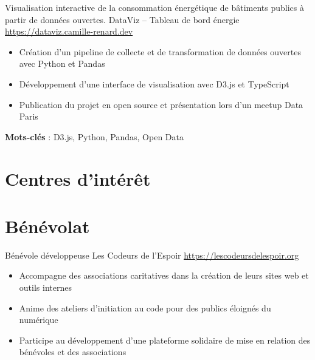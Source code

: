 \documentclass[a4paper, serif, 10pt]{moderncv}
\begin{document}
        {Visualisation interactive de la consommation énergétique de bâtiments publics à partir de données ouvertes.}
        {DataViz – Tableau de bord énergie}
        {\url{https://dataviz.camille-renard.dev}}
        {}
        {\begin{itemize}
\item Création d’un pipeline de collecte et de transformation de données ouvertes avec Python et Pandas
\item Développement d’une interface de visualisation avec D3.js et TypeScript
\item Publication du projet en open source et présentation lors d’un meetup Data Paris
\end{itemize}
\textbf{Mots-clés} : D3.js, Python, Pandas, Open Data}
\section{Centres d'intérêt}

\section{Bénévolat}

        {Bénévole développeuse}
        {Les Codeurs de l’Espoir}
        {\url{https://lescodeursdelespoir.org}}
        {}
        {\begin{itemize}
\item Accompagne des associations caritatives dans la création de leurs sites web et outils internes
\item Anime des ateliers d’initiation au code pour des publics éloignés du numérique
\item Participe au développement d’une plateforme solidaire de mise en relation des bénévoles et des associations
\end{itemize}}
    
\end{document}

